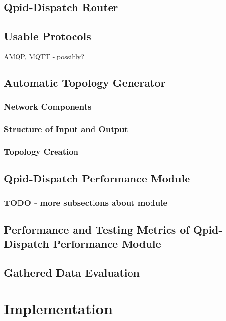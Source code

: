 \section{Qpid-Dispatch Router}

\section{Usable Protocols}
AMQP, MQTT - possibly?

\section{Automatic Topology Generator}

\subsection{Network Components}

\subsection{Structure of Input and Output}

\subsection{Topology Creation}

\section{Qpid-Dispatch Performance Module}

\subsection{TODO - more subsections about module}

\section{Performance and Testing Metrics of Qpid-Dispatch Performance Module}

\section{Gathered Data Evaluation}

\chapter{Implementation}

